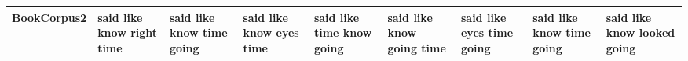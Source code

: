 \documentclass[11pt,a4paper]{article}
\begin{document}
\begin{appendices}
\begin{table}[htb]
\begin{tiny}
\begin{tabular}{|p{}|p{}|p{}|p{}|p{}|p{}|p{}|p{}|p{}|}
    BookCorpus2 & said \newline like \newline know \newline right \newline time & said \newline like \newline know \newline time \newline going & said \newline like \newline know \newline eyes \newline time & said \newline like \newline time \newline know \newline going & said \newline like \newline know \newline going \newline time & said \newline like \newline eyes \newline time \newline going & said \newline like \newline know \newline time \newline going & said \newline like \newline know \newline looked \newline going\\\hline

\end{tabular}
\end{tiny}
\end{table}
\end{appendices}
\end{document}
